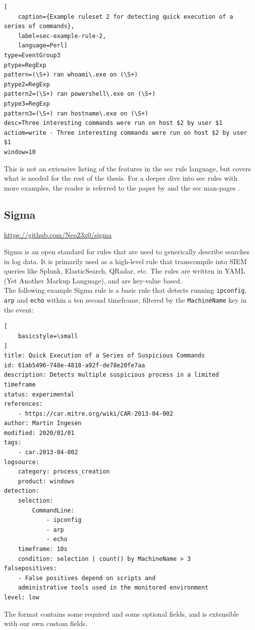 \begin{lstlisting}[
    caption={Example ruleset 2 for detecting quick execution of a series of commands},
    label=sec-example-rule-2,
    language=Perl]
type=EventGroup3
ptype=RegExp
pattern=(\S+) ran whoami\.exe on (\S+)
ptype2=RegExp
pattern2=(\S+) ran powershell\.exe on (\S+)
ptype3=RegExp
pattern3=(\S+) ran hostname\.exe on (\S+)
desc=Three interesting commands were run on host $2 by user $1
actiom=write - Three interesting commands were run on host $2 by user $1
window=10
\end{lstlisting}

This is not an extensive listing of the features in the \acrshort{sec} rule language, but covers what is needed for the rest of the thesis. For a deeper dive into \acrshort{sec} rules with more examples, the reader is referred to the paper  by \textcite{rouillard2004real} and the \acrshort{sec} man-pages \cite{secman}.

\subsection{Sigma}
\label{sub:sigma}
\url{https://github.com/Neo23x0/sigma}

Sigma is an open standard for rules that are used to generically describe searches in log data. It is primarily used as a high-level rule that transcompile into SIEM queries like Splunk, ElasticSearch, QRadar, etc. The rules are written in YAML (Yet Another Markup Language), and are key-value based.
\\
The following example Sigma rule is a basic rule that detects running \lstinline{ipconfig}, \lstinline{arp} and \lstinline{echo} within a ten second timeframe, filtered by the \lstinline{MachineName} key in the event: 

\begin{lstlisting}[
    basicstyle=\small
]
title: Quick Execution of a Series of Suspicious Commands
id: 61ab5496-748e-4818-a92f-de78e20fe7aa
description: Detects multiple suspicious process in a limited timeframe
status: experimental
references:
    - https://car.mitre.org/wiki/CAR-2013-04-002
author: Martin Ingesen
modified: 2020/01/01
tags:
    - car.2013-04-002
logsource:
    category: process_creation
    product: windows
detection:
    selection:
        CommandLine:
            - ipconfig
            - arp
            - echo
    timeframe: 10s
    condition: selection | count() by MachineName > 3
falsepositives:
    - False positives depend on scripts and
    administrative tools used in the monitored environment
level: low
\end{lstlisting}
The format contains some required and some optional fields, and is extensible with our own custom fields.

